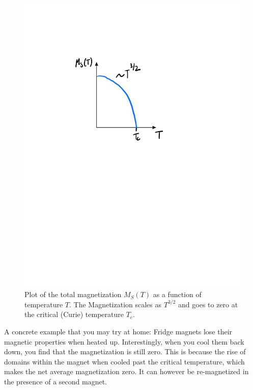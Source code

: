 \begin{figure}[htbp]
    \centering
    \includegraphics[scale=0.7]{Images/fig-magnetizationvstemperature.pdf}
    
    \caption{Plot of the total magnetization $M_S(T)$ as a function of temperature $T$. The Magnetization scales as $T^{3/2}$ and goes to zero at the critical (Curie) temperature $T_c$.}
    \label{fig-magnetizationvstemperature}
\end{figure}

A concrete example that you may try at home: Fridge magnets lose their magnetic properties when heated up. Interestingly, when you cool them back down, you find that the magnetization is still zero. This is because the rise of domains within the magnet when cooled past the critical temperature, which makes the net average magnetization zero. It can however be re-magnetized in the presence of a second magnet.

